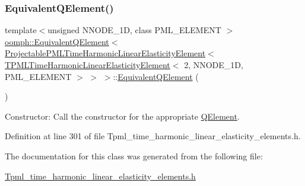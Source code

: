 \subsubsection{\texorpdfstring{Equivalent\+Q\+Element()}{EquivalentQElement()}}
{\footnotesize\ttfamily template$<$unsigned N\+N\+O\+D\+E\+\_\+1D, class P\+M\+L\+\_\+\+E\+L\+E\+M\+E\+NT $>$ \\
\hyperlink{classoomph_1_1EquivalentQElement}{oomph\+::\+Equivalent\+Q\+Element}$<$ \hyperlink{classoomph_1_1ProjectablePMLTimeHarmonicLinearElasticityElement}{Projectable\+P\+M\+L\+Time\+Harmonic\+Linear\+Elasticity\+Element}$<$ \hyperlink{classoomph_1_1TPMLTimeHarmonicLinearElasticityElement}{T\+P\+M\+L\+Time\+Harmonic\+Linear\+Elasticity\+Element}$<$ 2, N\+N\+O\+D\+E\+\_\+1D, P\+M\+L\+\_\+\+E\+L\+E\+M\+E\+NT $>$ $>$ $>$\+::\hyperlink{classoomph_1_1EquivalentQElement}{Equivalent\+Q\+Element} (\begin{DoxyParamCaption}{ }\end{DoxyParamCaption})\hspace{0.3cm}{\ttfamily [inline]}}



Constructor\+: Call the constructor for the appropriate \hyperlink{classoomph_1_1QElement}{Q\+Element}. 



Definition at line 301 of file Tpml\+\_\+time\+\_\+harmonic\+\_\+linear\+\_\+elasticity\+\_\+elements.\+h.



The documentation for this class was generated from the following file\+:\begin{DoxyCompactItemize}
\item 
\hyperlink{Tpml__time__harmonic__linear__elasticity__elements_8h}{Tpml\+\_\+time\+\_\+harmonic\+\_\+linear\+\_\+elasticity\+\_\+elements.\+h}\end{DoxyCompactItemize}
